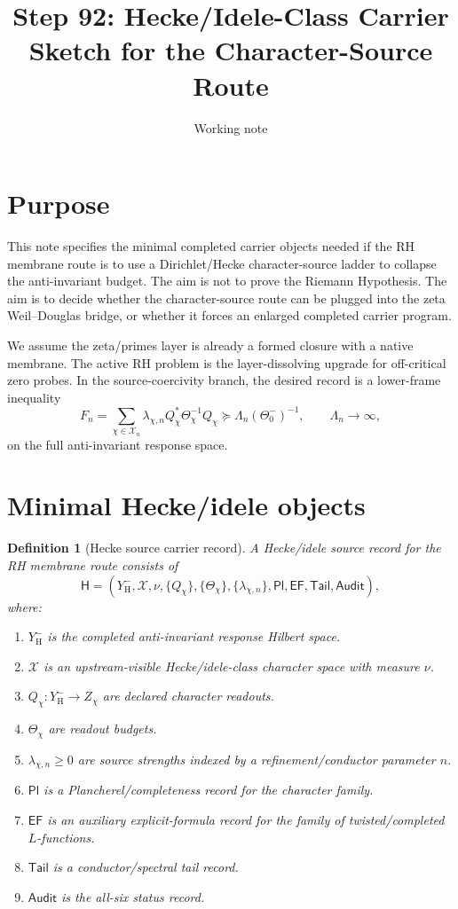 \documentclass[11pt]{article}
\title{Step 92: Hecke/Idele-Class Carrier Sketch for the Character-Source Route}
\author{Working note}
\date{}
\newtheorem{definition}[theorem]{Definition}
\begin{document}
\maketitle

\section{Purpose}
This note specifies the minimal completed carrier objects needed if the RH membrane route is to use a Dirichlet/Hecke character-source ladder to collapse the anti-invariant budget. The aim is not to prove the Riemann Hypothesis. The aim is to decide whether the character-source route can be plugged into the zeta Weil--Douglas bridge, or whether it forces an enlarged completed carrier program.

We assume the zeta/primes layer is already a formed closure with a native membrane. The active RH problem is the layer-dissolving upgrade for off-critical zero probes. In the source-coercivity branch, the desired record is a lower-frame inequality
\[
  F_n=\sum_{\chi\in\mathcal X_n}\lambda_{\chi,n}Q_\chi^*\Theta_\chi^{-1}Q_\chi
  \succeq \Lambda_n(\Theta_0^-)^{-1},
  \qquad \Lambda_n\to\infty,
\]
on the full anti-invariant response space.

\section{Minimal Hecke/idele objects}

\begin{definition}[Hecke source carrier record]
A Hecke/idele source record for the RH membrane route consists of
\[
  \mathsf H=(Y^-_{\mathrm H},\mathcal X,\nu,\{Q_\chi\},\{\Theta_\chi\},\{\lambda_{\chi,n}\},\mathsf{Pl},\mathsf{EF},\mathsf{Tail},\mathsf{Audit}),
\]
where:
\begin{enumerate}[label=(\roman*)]
\item $Y^-_{\mathrm H}$ is the completed anti-invariant response Hilbert space.
\item $\mathcal X$ is an upstream-visible Hecke/idele-class character space with measure $\nu$.
\item $Q_\chi:Y^-_{\mathrm H}\to Z_\chi$ are declared character readouts.
\item $\Theta_\chi$ are readout budgets.
\item $\lambda_{\chi,n}\ge0$ are source strengths indexed by a refinement/conductor parameter $n$.
\item $\mathsf{Pl}$ is a Plancherel/completeness record for the character family.
\item $\mathsf{EF}$ is an auxiliary explicit-formula record for the family of twisted/completed $L$-functions.
\item $\mathsf{Tail}$ is a conductor/spectral tail record.
\item $\mathsf{Audit}$ is the all-six status record.
\end{enumerate}
\end{definition}
\end{document}
